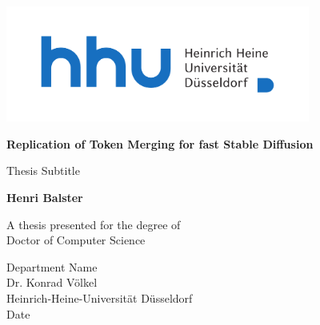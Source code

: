 \begin{titlepage}
    \centering
    \includegraphics[width=10cm]{static/Logo_HHU_+Name_horizontal_4c_+Safezone}\\

    \vspace*{2cm}

    \huge
    \textbf{Replication of Token Merging for fast Stable Diffusion}
    
    \large
    \vspace{1cm}
    Thesis Subtitle
            
    \vspace{1.5cm}

    \textbf{Henri Balster}

    \vfill
            
    A thesis presented for the degree of\\
    Doctor of Computer Science
            
    \vspace{0.8cm}
            
    Department Name\\
    Dr. Konrad Völkel\\
    Heinrich-Heine-Universität Düsseldorf\\
    Date
            
\end{titlepage}